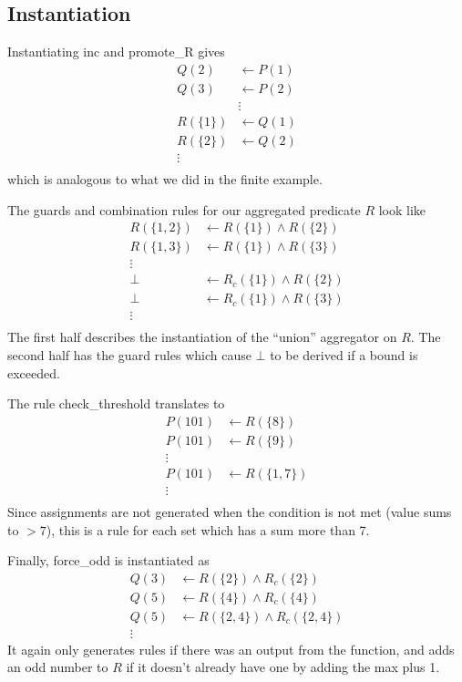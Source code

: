 \subsection{Instantiation}
Instantiating inc and promote_R gives
\begin{align*}
	Q(2) &\leftarrow P(1)\\
	Q(3) &\leftarrow P(2)\\
	&\vdots\\
	R(\{1\}) &\leftarrow Q(1)\\
	R(\{2\}) &\leftarrow Q(2)\\
	\vdots\\
\end{align*}
which is analogous to what we did in the finite example.

The guards and combination rules for our aggregated predicate $R$ look like
\begin{align*}
	R(\{1, 2\}) &\leftarrow R(\{1\}) \wedge R(\{2\})\\
	R(\{1, 3\}) &\leftarrow R(\{1\}) \wedge R(\{3\})\\
	\vdots\\
	\bot &\leftarrow R_c(\{1\}) \wedge R(\{2\})\\
	\bot &\leftarrow R_c(\{1\}) \wedge R(\{3\})\\
	\vdots\\
\end{align*}
The first half describes the instantiation of the ``union'' aggregator on $R$.
The second half has the guard rules which cause $\bot$ to be derived if a bound is exceeded.

The rule check\_threshold translates to
\begin{align*}
	P(101) &\leftarrow R(\{8\})\\
	P(101) &\leftarrow R(\{9\})\\
	\vdots\\
	P(101) &\leftarrow R(\{1, 7\})\\
	\vdots\\
\end{align*}
Since assignments are not generated when the condition is not met (value sums to $> 7$), this is a rule for each set which has a sum more than 7.

Finally, force\_odd is instantiated as
\begin{align*}
	Q(3) &\leftarrow R(\{2\}) \wedge R_c(\{2\})\\
	Q(5) &\leftarrow R(\{4\}) \wedge R_c(\{4\})\\
	Q(5) &\leftarrow R(\{2, 4\}) \wedge R_c(\{2, 4\})\\
	\vdots
\end{align*}
It again only generates rules if there was an output from the function, and adds an odd number to $R$ if it doesn't already have one by adding the max plus 1.

